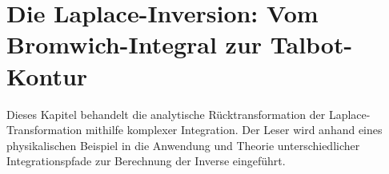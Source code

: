 %
%
%
%



\chapter{Die Laplace-Inversion: Vom Bromwich-Integral zur Talbot-Kontur\label{chapter:laplace}}
\begin{refsection}

%
%
%
%

\noindent
Dieses Kapitel behandelt die analytische Rücktransformation der Laplace-Transformation mithilfe komplexer Integration.
%
Der Leser wird anhand eines physikalischen Beispiel in die Anwendung und Theorie unterschiedlicher Integrationspfade zur Berechnung der Inverse eingeführt.





%









\printbibliography[heading=subbibliography]
\end{refsection}
